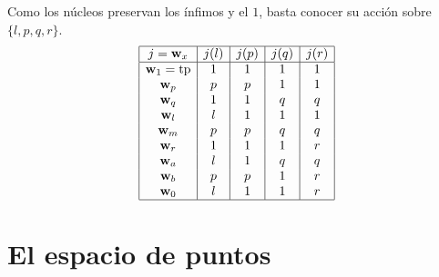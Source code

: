 \begin{sol}
    Como los núcleos preservan los ínfimos y el $1$,
    basta conocer su acción sobre $\{l,p,q,r\}$.
    \[ 
        \begin{array}{|c|c|c|c|c|}
            \hline
        j = \mathbf w_{x} & j(l) & j(p) & j(q) & j(r) \\
            \hline
      \mathbf w_{1} = \mathrm{tp} &  1   & 1    & 1    & 1 \\
            \mathbf w_{p} &  p   & p    & 1    & 1 \\
            \mathbf w_{q} &  1   & 1    & q    & q \\
            \mathbf w_{l} &  l   & 1    & 1    & 1 \\
            \mathbf w_{m} &  p   & p    & q    & q \\
            \mathbf w_{r} &  1   & 1    & 1    & r \\
            \mathbf w_{a} &  l   & 1    & q    & q \\
            \mathbf w_{b} &  p   & p    & 1    & r \\
            \mathbf w_{0} &  l   & 1    & 1    & r \\
            \hline
        \end{array}
    \]
\end{sol}

\part{El espacio de puntos}
\label{part:espacio-de-puntos}

